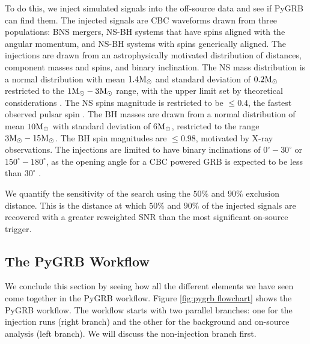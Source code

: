 \documentclass[11pt]{cuthesis}
\begin{document}
To do this, we inject simulated signals into the off-source data and see if PyGRB can find them. The injected signals are CBC waveforms drawn from three populations: BNS mergers, NS-BH systems that have spins aligned with the angular momentum, and NS-BH systems with spins generically aligned. The injections are drawn from an astrophysically motivated distribution of distances, component masses and spins, and binary inclination. The NS mass distribution is a normal distribution with mean $1.4 \textup{M}_\odot$ and standard deviation of $0.2 \textup {M}_\odot$\cite{Kiziltan_2013}\cite{ozel} restricted to the $1 \textup{M}_\odot-3\textup {M}_\odot$ range, with the upper limit set by theoretical considerations \cite{Kalogera_1996}. The NS spins magnitude is restricted to be $\leq 0.4$, the fastest observed pulsar spin \cite{Hessels1901}. The BH masses are drawn from a normal distribution of mean $10 \textup{M}_\odot$ with standard deviation of 6$ \textup{M}_\odot$, restricted to the range $3 \textup{M}_\odot-15 \textup{M}_\odot$. The BH spin magnitudes are $\leq 0.98$, motivated by X-ray observations\cite{ozel_2010}. The injections are limited to have binary inclinations of $0^\circ-30^\circ$ or $150^\circ-180^\circ$, as the opening angle for a CBC powered GRB is expected to be less than $30^\circ$ \cite{Lazzati_afterglow}. 

We quantify the sensitivity of the search using the $50\%$ and $90\%$  exclusion distance. This is the distance at which $50\%$ and $90\%$ of the injected signals are recovered with a greater reweighted SNR than the most significant on-source trigger. 


\subsection{The PyGRB Workflow}
We conclude this section by seeing how all the different elements we have seen come together in the PyGRB workflow. Figure \ref{fig:pygrb flowchart} shows the PyGRB workflow. The workflow starts with two parallel branches: one for the injection runs (right branch) and the other for the background and on-source analysis (left branch). We will discuss the non-injection branch first. 
\end{document}
